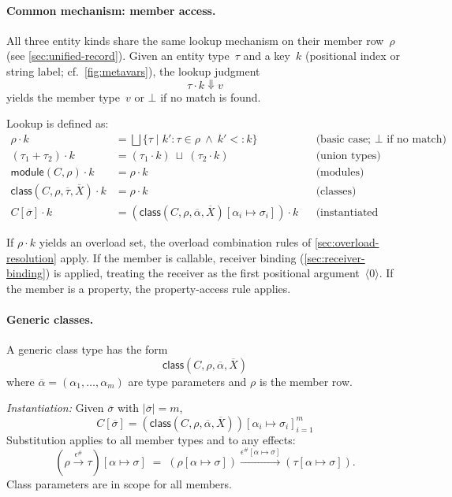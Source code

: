 \paragraph{Common mechanism: member access.}
All three entity kinds share the same lookup mechanism on their member row~$\rho$ (see \cref{sec:unified-record}).  
Given an entity type~$\tau$ and a key~$k$ (positional index or string label; cf.\ \cref{fig:metavars}), the lookup judgment
\[
\tau \cdot k \Downarrow v
\]
yields the member type~$v$ or $\bot$ if no match is found.

Lookup is defined as:
\begin{align*}
\rho \cdot k &= \bigsqcup \{\tau \mid k'{:}\tau \in \rho \ \wedge\ k' <: k \}
  &&\text{(basic case; $\bot$ if no match)}\\
(\tau_1 + \tau_2) \cdot k &= (\tau_1 \cdot k) \ \sqcup\ (\tau_2 \cdot k)
  &&\text{(union types)} \\
\mathsf{module}(C, \rho) \cdot k &= \rho \cdot k
  &&\text{(modules)}\\
\mathsf{class}(C, \rho, \overline{\tau}, \overline{X}) \cdot k &= \rho \cdot k
  &&\text{(classes)}\\
C[\overline{\sigma}] \cdot k &= (\mathsf{class}(C, \rho, \overline{\alpha}, \overline{X})[\alpha_i \mapsto \sigma_i]) \cdot k
  &&\text{(instantiated classes)}
\end{align*}

If $\rho \cdot k$ yields an overload set, the overload combination rules of \cref{sec:overload-resolution} apply.  
If the member is callable, receiver binding (\cref{sec:receiver-binding}) is applied, treating the receiver as the first positional argument~$\langle 0\rangle$.  
If the member is a property, the property-access rule applies.

\paragraph{Generic classes.}
A generic class type has the form
\[
\mathsf{class}(C, \rho, \overline{\alpha}, \overline{X})
\]
where $\overline{\alpha} = (\alpha_1,\dots,\alpha_m)$ are type parameters and $\rho$ is the member row.

\emph{Instantiation:} Given $\overline{\sigma}$ with $|\overline{\sigma}| = m$,
\[
C[\overline{\sigma}] = (\mathsf{class}(C, \rho, \overline{\alpha}, \overline{X}))[\alpha_i \mapsto \sigma_i]_{i=1}^m
\]
Substitution applies to all member types and to any effects:
\[
(\rho \xrightarrow{\epsilon^\#} \tau)[\alpha \mapsto \sigma] \;=\; (\rho[\alpha \mapsto \sigma]) \xrightarrow{\epsilon^\#[\alpha \mapsto \sigma]} (\tau[\alpha \mapsto \sigma]).
\]
Class parameters are in scope for all members.

